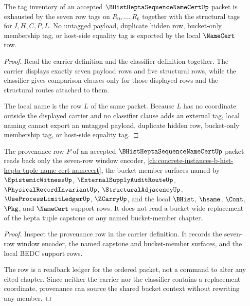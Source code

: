 \begin{theorem}
\label{thm:b-hist-hepta-sequence-name-cert-tag-exhaustion}
The tag inventory of an accepted $\BHistHeptaSequenceNameCertUp$ packet is exhausted by the seven row tags on $R_0,\ldots,R_6$ together with the structural tags for $I,H,C,P,L$. No untagged payload, duplicate hidden row, bucket-only membership tag, or host-side equality tag is exported by the local $\NameCert$ row.
\end{theorem}
\begin{proof}
Read the carrier definition and the classifier definition together. The carrier displays exactly seven payload rows and five structural rows, while the classifier gives comparison clauses only for those displayed rows and the structural routes attached to them.

The local name is the row $L$ of the same packet. Because $L$ has no coordinate outside the displayed carrier and no classifier clause adds an external tag, local naming cannot export an untagged payload, duplicate hidden row, bucket-only membership tag, or host-side equality tag.
\end{proof}

\begin{theorem}
\label{thm:b-hist-hepta-sequence-name-cert-provenance-readback}
The provenance row $P$ of an accepted $\BHistHeptaSequenceNameCertUp$ packet reads back only the seven-row window encoder, \autoref{ch:concrete-instances-b-hist-hepta-tuple-name-cert-namecert}, the bucket-member surfaces named by $\EpistemicWitnessUp$, $\ExternalSupplyAuditRouteUp$, $\PhysicalRecordInvariantUp$, $\StructuralAdjacencyUp$, $\UseProcessLimitLedgerUp$, $\ZCarryUp$, and the local $\BHist$, $\hsame$, $\Cont$, $\Pkg$, and $\NameCert$ support rows. It does not read a bucket-wide replacement of the hepta tuple capstone or any named bucket-member chapter.
\end{theorem}
\begin{proof}
Inspect the provenance row in the carrier definition. It records the seven-row window encoder, the named capstone and bucket-member surfaces, and the local BEDC support rows.

The row is a readback ledger for the ordered packet, not a command to alter any cited chapter. Since neither the carrier nor the classifier contains a replacement coordinate, provenance can source the shared bucket context without rewriting any member.
\end{proof}

